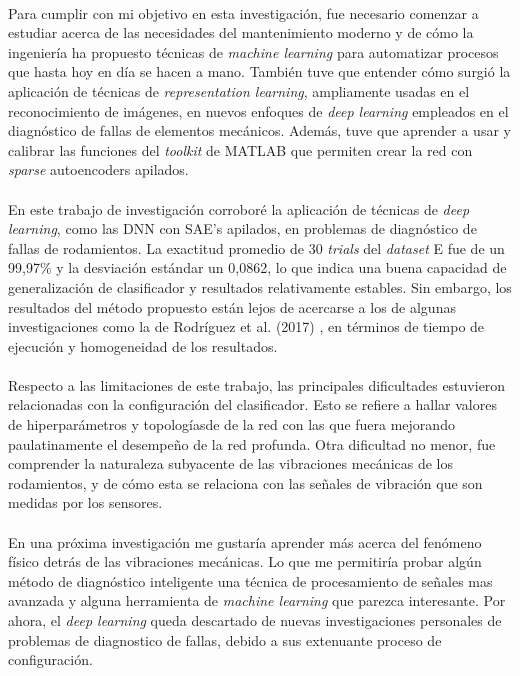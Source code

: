 \documentclass[12pt]{article}%
\begin{document}
\paragraph{}
Para cumplir con mi objetivo en esta investigación, fue necesario comenzar a estudiar acerca de las necesidades del mantenimiento moderno y de cómo la ingeniería ha propuesto técnicas de \textit{machine learning} para automatizar procesos que hasta hoy en día se hacen a mano. También tuve que entender cómo surgió la aplicación de técnicas de \textit{representation learning}, ampliamente usadas en el reconocimiento de imágenes, en nuevos enfoques de \textit{deep learning} empleados en el diagnóstico de fallas de elementos mecánicos. Además, tuve que aprender a usar y calibrar las funciones del \textit{toolkit} de MATLAB que permiten crear la red con \textit{sparse} autoencoders apilados.

\paragraph{}
En este trabajo de investigación corroboré la aplicación de técnicas de \textit{deep learning}, como las DNN con SAE's apilados, en problemas de diagnóstico de fallas de rodamientos. La exactitud promedio de 30 \textit{trials} del \textit{dataset} E fue de un 99,97\% y la desviación estándar un 0,0862, lo que indica una buena capacidad de generalización de clasificador y resultados relativamente estables. Sin embargo, los resultados del método propuesto están lejos de acercarse a los de algunas investigaciones como la de Rodríguez et al. (2017) \cite{nibaldo}, en términos de tiempo de ejecución y homogeneidad de los resultados.

\paragraph{}
Respecto a las limitaciones de este trabajo, las principales dificultades estuvieron relacionadas con la configuración del clasificador. Esto se refiere a hallar valores de hiperparámetros y topologíasde de la red con las que fuera mejorando paulatinamente el desempeño de la red profunda. Otra dificultad no menor, fue comprender la naturaleza subyacente de las vibraciones mecánicas de los rodamientos, y de cómo esta se relaciona con las señales de vibración que son medidas por los sensores. 

\paragraph{}
En una próxima investigación me gustaría aprender más acerca del fenómeno físico detrás de las vibraciones mecánicas. Lo que me permitiría probar algún método de diagnóstico inteligente una técnica de procesamiento de señales mas avanzada y alguna herramienta de \textit{machine learning} que parezca interesante. Por ahora, el \textit{deep learning} queda descartado de nuevas investigaciones personales de problemas de diagnostico de fallas, debido a sus extenuante proceso de configuración.
\end{document}
